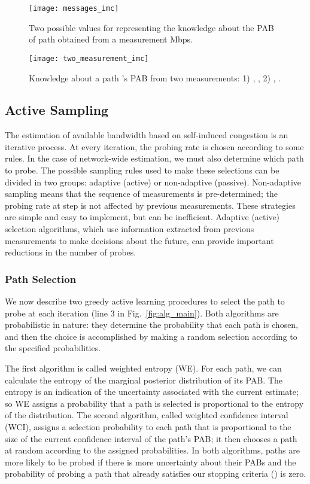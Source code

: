 \documentclass[final,5p,times,twocolumn]{elsarticle}
\begin{document}
\begin{figure}[!h]
\centering
\texttt{[image: messages\_imc]}
\caption{Two possible values for  representing the knowledge about the PAB of path  obtained from a measurement Mbps.\label{fig:measurement_msg_imc}}
\end{figure}

\begin{figure}[!h]
\centering
\texttt{[image: two\_measurement\_imc]}
\caption{Knowledge about a path 's PAB from two measurements: 1) , , 2) , .\label{fig:two_measurements_imc}}
\end{figure}


\subsection{Active Sampling}

The estimation of available bandwidth based on self-induced congestion is an iterative process.  At every iteration, the probing rate is chosen according to some rules.  In the case of network-wide estimation, we must also determine which path to probe.  The possible sampling rules used to make these selections can be divided in two groups: adaptive (active) or non-adaptive (passive).  Non-adaptive sampling means that the sequence of measurements is pre-determined; the probing rate at step  is not affected by previous measurements.  These strategies are simple and easy to implement, but can be inefficient.  Adaptive (active) selection algorithms, which use information extracted from previous measurements to make decisions about the future, can provide important reductions in the number of probes.  

\subsubsection{Path Selection}

We now describe two greedy active learning procedures to select the path to probe at each iteration (line 3 in Fig.~\ref{fig:alg_main}). Both algorithms are probabilistic in nature: they determine the probability that each path is chosen, and then the choice is accomplished by making a random selection according to the specified probabilities.

The first algorithm is called weighted entropy (WE).  For each path, we can calculate the entropy of the marginal posterior distribution of its PAB.  The entropy is an indication of the uncertainty associated with the current estimate; so WE assigns a probability that a path is selected is proportional to the entropy of the distribution.
The second algorithm, called weighted confidence interval (WCI), assigns a selection probability to each path that is proportional to the size of the current confidence interval  of the path's PAB; it then chooses a path at random according to the assigned probabilities. 
In both algorithms, paths are more likely to be probed if there is more uncertainty about their PABs and the probability of probing a path that already satisfies our stopping criteria () is zero.
\end{document}
